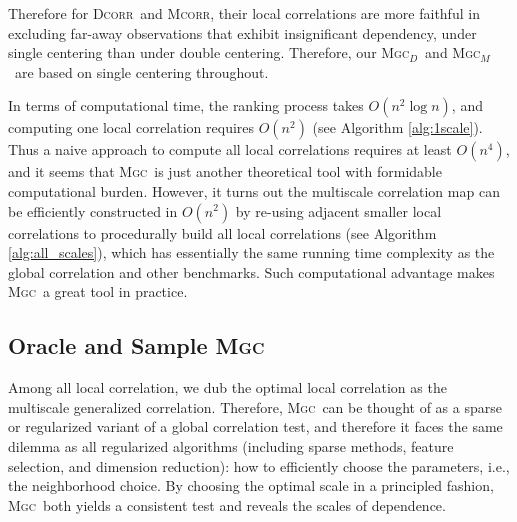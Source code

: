 \documentclass[11pt]{article}
\providecommand{\sct}[1]{{\normalfont\textsc{#1}}}
\newcommand{\Mgc}{\sct{Mgc}}
\newcommand{\Mgcd}{\sct{Mgc$_D$}}
\newcommand{\Mgcm}{\sct{Mgc$_M$}}
\newcommand{\Hhg}{\sct{Hhg}}
\newcommand{\Dcorr}{\sct{Dcorr}}
\newcommand{\Mcorr}{\sct{Mcorr}}
\newcommand{\Mantel}{\sct{Mantel}}
\begin{document}
Therefore for \Dcorr~and \Mcorr, their local correlations are more faithful in excluding far-away observations that exhibit insignificant dependency, under single centering than under double centering. Therefore, our \Mgcd~and \Mgcm~are based on single centering throughout.

In terms of computational time, the ranking process takes $O(n^2 \log n)$, and computing one local correlation requires $O(n^2)$ (see Algorithm \ref{alg:1scale}). Thus a naive approach to compute all local correlations requires at least $O(n^4)$, and it seems that \Mgc~is just another theoretical tool with formidable computational burden. However, it turns out the multiscale correlation map can be efficiently constructed in $O(n^2)$ by re-using adjacent smaller local correlations to procedurally build all local correlations (see Algorithm \ref{alg:all_scales}), which has essentially the same running time complexity as the global correlation and other benchmarks. Such computational advantage makes \Mgc~a great tool in practice.

\subsection{Oracle and Sample \Mgc}
\label{appen:mgc2}
Among all local correlation, we dub the optimal local correlation as the multiscale generalized correlation. Therefore, \Mgc~can be thought of as a sparse or regularized variant of a global correlation test, and therefore it faces the same dilemma as all regularized algorithms (including sparse methods, feature selection, and dimension reduction): how to efficiently choose the parameters, i.e., the neighborhood choice. By choosing the optimal scale in a principled fashion, \Mgc~both yields a consistent test and reveals the scales of dependence.  


\end{document}
